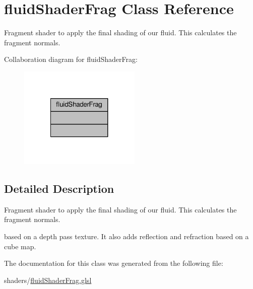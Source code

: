 \hypertarget{classfluid_shader_frag}{\section{fluid\-Shader\-Frag Class Reference}
\label{classfluid_shader_frag}
}


Fragment shader to apply the final shading of our fluid. This calculates the fragment normals.  




Collaboration diagram for fluid\-Shader\-Frag\-:\nopagebreak
\begin{figure}[H]
\begin{center}
\leavevmode
\includegraphics[width=164pt]{classfluid_shader_frag__coll__graph}
\end{center}
\end{figure}


\subsection{Detailed Description}
Fragment shader to apply the final shading of our fluid. This calculates the fragment normals. 

based on a depth pass texture. It also adds reflection and refraction based on a cube map. 

The documentation for this class was generated from the following file\-:\begin{DoxyCompactItemize}
\item 
shaders/\hyperlink{fluid_shader_frag_8glsl}{fluid\-Shader\-Frag.\-glsl}\end{DoxyCompactItemize}
